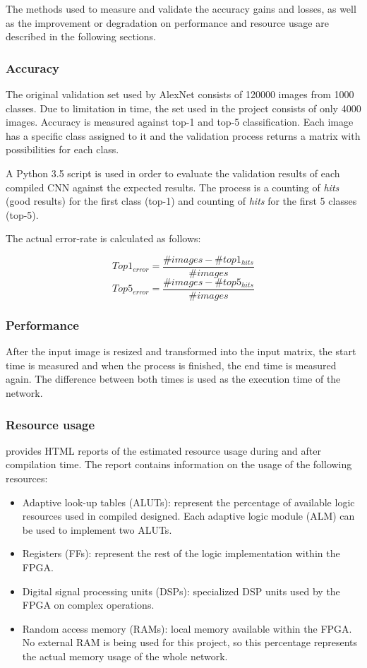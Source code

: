 \begin{enumerate}
The methods used to measure and validate the accuracy gains and losses, as well as the
improvement or degradation on performance and resource usage are described in the following
sections.

\subsubsection{Accuracy}

The original validation set used by AlexNet consists of 120000 images from 1000 classes.
Due to limitation in time, the set used in the project consists of only 4000 images.
Accuracy is measured against top-1 and top-5 classification. Each image has a specific class
assigned to it and the validation process returns a matrix with possibilities
for each class.

A Python 3.5 script is used in order to evaluate the validation results of each compiled
CNN against the expected results. The process is a counting of \textit{hits} (good results) for
the first class (top-1) and counting of \textit{hits} for the first 5 classes (top-5).

The actual error-rate is calculated as follows:

$$
Top1_{error} = \frac{\#images - \#top1_{hits}}{\#images}
$$
$$
Top5_{error} = \frac{\#images - \#top5_{hits}}{\#images}
$$

\subsubsection{Performance}

After the input image is resized and transformed into the input matrix, the start time
is measured and when the process is finished, the end time is measured again. The difference
between both times is used as the execution time of the network.

\subsubsection{Resource usage}

\intelOCL \hspace{1mm}provides HTML reports of the estimated resource usage during and after compilation time.
The report contains information on the usage of the following resources:
\begin{itemize}
    \item Adaptive look-up tables (ALUTs): represent the percentage of
    available logic resources used in compiled designed. Each adaptive logic module (ALM)
    can be used to implement two ALUTs.
    \item Registers (FFs): represent the rest of the logic implementation within the
    FPGA.
    \item Digital signal processing units (DSPs): specialized DSP units used by the FPGA
    on complex operations.
    \item Random access memory (RAMs): local memory available within the FPGA. No external RAM
    is being used for this project, so this percentage represents the actual memory usage
    of the whole network.
\end{itemize}


\end{enumerate}
